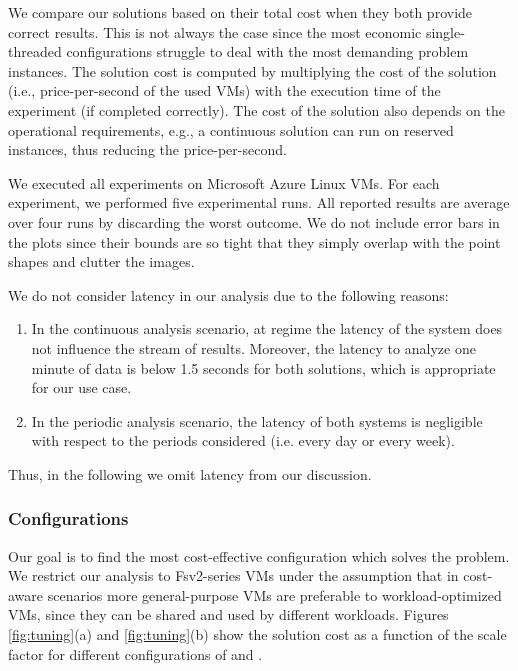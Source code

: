 {We compare our solutions based on their total cost when they both provide correct results. This is not always the case since the most economic single-threaded configurations struggle to deal with the most demanding problem instances. The solution cost is computed by multiplying the cost of the solution (i.e., price-per-second of the used VMs) with the execution time of the experiment (if completed correctly). The cost of the solution also depends on the operational requirements, e.g., a continuous solution can run on reserved instances, thus reducing the price-per-second.

We executed all experiments on Microsoft Azure Linux VMs. For each experiment, we performed five experimental runs. All reported results are average over four runs by discarding the worst outcome. We do not include error bars in the plots since their bounds are so tight that they simply overlap with the point shapes and clutter the images.

We do not consider latency in our analysis due to the following reasons:
\begin{enumerate}
\item In the continuous analysis scenario, at regime the latency of the system does not influence the stream of results. Moreover, the latency to analyze one minute of data is below 1.5 seconds for both solutions, which is appropriate for our use case.
\item In the periodic analysis scenario, the latency of both systems is negligible with respect to the periods considered (i.e. every day or every week).
\end{enumerate}
Thus, in the following we omit latency from our discussion.

\subsubsection{Configurations}
Our goal is to find the most cost-effective configuration which solves the problem. We restrict our analysis to Fsv2-series VMs under the assumption that in cost-aware scenarios more general-purpose VMs are preferable to workload-optimized VMs, since they can be shared and used by different workloads. Figures \ref{fig:tuning}(a) and \ref{fig:tuning}(b) show the solution cost as a function of the scale factor for different configurations of \sti{} and \sparkdi{}. 

}
